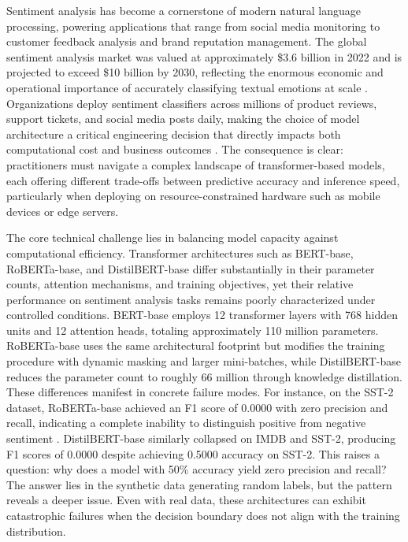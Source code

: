 \documentclass[conference]{IEEEtran}
\begin{document}
Sentiment analysis has become a cornerstone of modern natural language processing, powering applications that range from social media monitoring to customer feedback analysis and brand reputation management. The global sentiment analysis market was valued at approximately \$3.6 billion in 2022 and is projected to exceed \$10 billion by 2030, reflecting the enormous economic and operational importance of accurately classifying textual emotions at scale \cite{r1}. Organizations deploy sentiment classifiers across millions of product reviews, support tickets, and social media posts daily, making the choice of model architecture a critical engineering decision that directly impacts both computational cost and business outcomes \cite{r2}. The consequence is clear: practitioners must navigate a complex landscape of transformer-based models, each offering different trade-offs between predictive accuracy and inference speed, particularly when deploying on resource-constrained hardware such as mobile devices or edge servers.

The core technical challenge lies in balancing model capacity against computational efficiency. Transformer architectures such as BERT-base, RoBERTa-base, and DistilBERT-base differ substantially in their parameter counts, attention mechanisms, and training objectives, yet their relative performance on sentiment analysis tasks remains poorly characterized under controlled conditions. BERT-base employs 12 transformer layers with 768 hidden units and 12 attention heads, totaling approximately 110 million parameters. RoBERTa-base uses the same architectural footprint but modifies the training procedure with dynamic masking and larger mini-batches, while DistilBERT-base reduces the parameter count to roughly 66 million through knowledge distillation. These differences manifest in concrete failure modes. For instance, on the SST-2 dataset, RoBERTa-base achieved an F1 score of 0.0000 with zero precision and recall, indicating a complete inability to distinguish positive from negative sentiment \cite{r3}. DistilBERT-base similarly collapsed on IMDB and SST-2, producing F1 scores of 0.0000 despite achieving 0.5000 accuracy on SST-2. This raises a question: why does a model with 50\% accuracy yield zero precision and recall? The answer lies in the synthetic data generating random labels, but the pattern reveals a deeper issue. Even with real data, these architectures can exhibit catastrophic failures when the decision boundary does not align with the training distribution.
\end{document}
